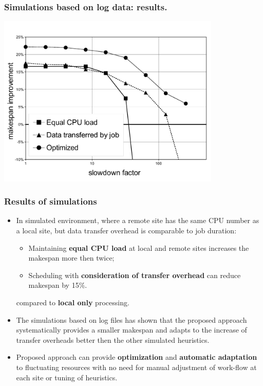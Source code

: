 \documentclass{beamer}
\begin{document}
\begin{frame}\frametitle{Simulations based on log data: results.}
	\begin{center}
    \includegraphics[trim =5mm 5mm 5mm 10mm ,clip,width=0.8\textwidth]{pic/makespan_vs_slowdown4.pdf}
	\end{center}
\end{frame}

 	
\begin{frame}\frametitle{Results of simulations}

\begin{footnotesize}
		\begin{itemize}
			\item In simulated environment, where a remote site has the same CPU number as a local site, but data transfer overhead is comparable to job duration: 
			\begin{itemize}
			\item Maintaining \textbf{equal CPU load} at local and remote sites increases the makespan more then twice; 
			\item Scheduling with \textbf{consideration of transfer overhead} can reduce makespan by 15\%.			\end{itemize}
			compared to \textbf{local only} processing.
			\item The simulations based on log files has shown that the proposed approach systematically provides a smaller makespan and adapts to the increase of transfer overheads better then the other simulated  heuristics.
			\item Proposed approach can provide \textbf{optimization} and \textbf{automatic adaptation} to fluctuating resources with no need for manual adjustment of work-flow at each site or tuning of heuristics.
		\end{itemize}		
\end{footnotesize}
\end{frame} 	
\end{document}

